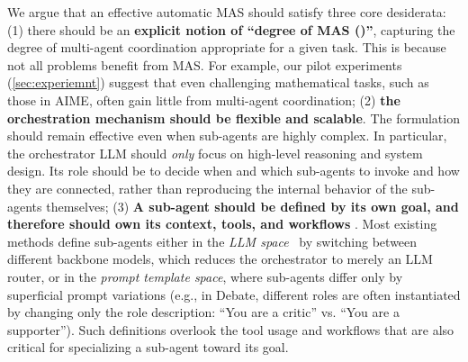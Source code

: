We argue that an effective automatic MAS should satisfy three core desiderata: (1) there should be an \textbf{explicit notion of ``degree of MAS (\masness)''}, capturing the degree of multi-agent coordination appropriate for a given task. This is because not all problems benefit from MAS. For example, our pilot experiments (\cref{sec:experiemnt}) suggest that even challenging mathematical tasks, such as those in AIME, often gain little from multi-agent coordination; (2) \textbf{the orchestration mechanism should be flexible and scalable}. The formulation should remain effective even when sub-agents are highly complex. In particular, the orchestrator LLM should \textit{only} focus on high-level reasoning and system design. Its role should be to decide when and which sub-agents to invoke and how they are connected, rather than reproducing the internal behavior of the sub-agents themselves; (3) \textbf{A sub-agent should be defined by its own goal, and therefore should own its context, tools, and workflows} \cite{anthropic_subagents_2024}. %
 {Most existing methods define sub-agents either in the \textit{LLM space}~\cite{jin2025controllingperformancebudgetcentralized,estornell2025trainleaderhierarchicalreasoning,dang2025multiagentcollaborationevolvingorchestration} by switching between different backbone models, which reduces the orchestrator to merely an LLM router, or in the \textit{prompt
template space}, where sub-agents differ only by superficial prompt variations (e.g., in Debate, different roles are often instantiated by
changing only the role description: ``You are a
critic'' vs. ``You are a supporter''). Such definitions overlook the tool usage and workflows that are also critical for specializing a sub-agent toward its goal.}







